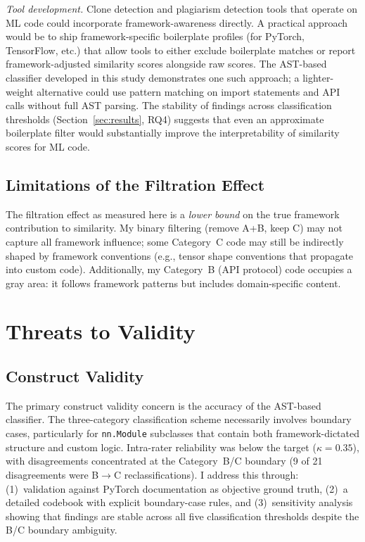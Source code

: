 \documentclass[smallextended,natbib]{svjour3}
\begin{document}
\emph{Tool development.} Clone detection and plagiarism detection tools that operate on ML code could incorporate framework-awareness directly. A practical approach would be to ship framework-specific boilerplate profiles (for PyTorch, TensorFlow, etc.) that allow tools to either exclude boilerplate matches or report framework-adjusted similarity scores alongside raw scores. The AST-based classifier developed in this study demonstrates one such approach; a lighter-weight alternative could use pattern matching on import statements and API calls without full AST parsing. The stability of findings across classification thresholds (Section~\ref{sec:results}, RQ4) suggests that even an approximate boilerplate filter would substantially improve the interpretability of similarity scores for ML code.

\subsection{Limitations of the Filtration Effect}

The filtration effect as measured here is a \emph{lower bound} on the true framework contribution to similarity. My binary filtering (remove A+B, keep C) may not capture all framework influence; some Category~C code may still be indirectly shaped by framework conventions (e.g., tensor shape conventions that propagate into custom code). Additionally, my Category~B (API protocol) code occupies a gray area: it follows framework patterns but includes domain-specific content.


\section{Threats to Validity}
\label{sec:threats}

\subsection{Construct Validity}

The primary construct validity concern is the accuracy of the AST-based classifier. The three-category classification scheme necessarily involves boundary cases, particularly for \texttt{nn.Module} subclasses that contain both framework-dictated structure and custom logic. Intra-rater reliability was below the target ($\kappa = 0.35$), with disagreements concentrated at the Category~B/C boundary (9 of 21 disagreements were B$\rightarrow$C reclassifications). I address this through: (1)~validation against PyTorch documentation as objective ground truth, (2)~a detailed codebook with explicit boundary-case rules, and (3)~sensitivity analysis showing that findings are stable across all five classification thresholds despite the B/C boundary ambiguity.
\end{document}
